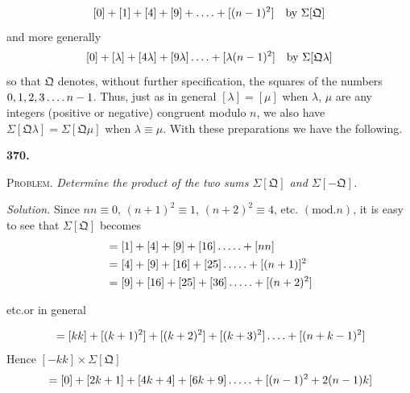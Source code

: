 \[
{}[0]+[1]+[4]+[9]+\mathinner{.\,.\,.\,.}+[(n-1)^2]\quad\text{by }\Sigma[\mathfrak{Q}]
\]
and more generally
\[
{}[0]+[\lambda]+[4\lambda]+[9\lambda]\mathinner{.\,.\,.\,.}+[\lambda(n-1)^2]\quad\text{by }\Sigma[\mathfrak{Q}\lambda]
\]
so that $\mathfrak{Q}$ denotes, without further specification, the squares of the numbers $0,1,2,3\mathinner{.\,.\,.\,.} n-1$. Thus, just as in general $[\lambda]=[\mu]$ when $\lambda$, $\mu$ are any integers (positive or negative) congruent modulo $n$, we also have $\Sigma[\mathfrak{Q}\lambda]=\Sigma[\mathfrak{Q}\mu]$ when $\lambda\equiv\mu$. With these preparations we have the following.
\par\medskip{}\centerline{\textbf{370.}}\nobreak\smallskip
\textsc{Problem.} \textit{Determine the product of the two sums $\Sigma[\mathfrak{Q}]$ and $\Sigma[-\mathfrak{Q}]$.}
\par\noindent\textit{Solution.} Since $nn\equiv0$, $(n+1)^2\equiv1$, $(n+2)^2\equiv4$, etc. $(\mathrm{mod}.n)$, it is easy to see that $\Sigma[\mathfrak{Q}]$ becomes
\[
\begin{aligned}
&=[1]+[4]+[9]+[16]\mathinner{.\,.\,.\,.\,.}+[nn]\\
&=[4]+[9]+[16]+[25]\mathinner{.\,.\,.\,.\,.}+[(n+1)]^2\\
&=[9]+[16]+[25]+[36]\mathinner{.\,.\,.\,.\,.}+[(n+2)^2]
\end{aligned}
\]
\centerline{etc.\quad or in general}
\[
{}=[kk]+[(k+1)^2]+[(k+2)^2]+[(k+3)^2]\mathinner{.\,.\,.\,.}+[(n+k-1)^2]
\]
Hence $[-kk]\times\Sigma[\mathfrak{Q}]$
\[
{}=[0]+[2k+1]+[4k+4]+[6k+9]\mathinner{.\,.\,.\,.\,.}+[(n-1)^2+2(n-1)k]
\]

